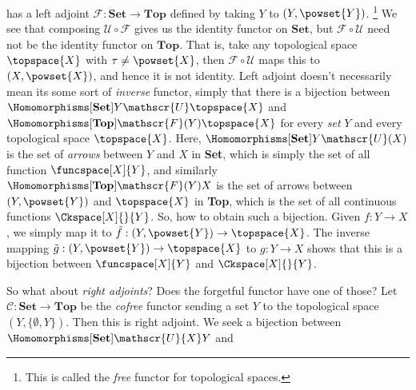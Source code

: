 \documentclass{book}                                                           %
\begin{document}
                has a left adjoint $\mathscr{F}:\mathbf{Set}\rightarrow\mathbf{Top}$
                defined by taking $Y$ to $(Y,\powset{Y})$.%
                \footnote{%
                    This is called the \textit{free} functor for topological
                    spaces.
                }
                We see that composing $\mathscr{U}\circ\mathscr{F}$ gives us
                the identity functor on $\mathbf{Set}$, but
                $\mathscr{F}\circ\mathscr{U}$ need not be the identity functor
                on $\mathbf{Top}$. That is, take any topological space
                $\topspace{X}$ with $\tau\ne\powset{X}$, then
                $\mathscr{F}\circ\mathscr{U}$ maps this to $(X,\powset{X})$, and
                hence it is not identity. Left adjoint doesn't necessarily mean
                its some sort of \textit{inverse} functor, simply that there is
                a bijection between
                $\Homomorphisms[\textbf{Set}]{Y}{\mathscr{U}\topspace{X}}$
                and $\Homomorphisms[\textbf{Top}]{\mathscr{F}(Y)}{\topspace{X}}$
                for every \textit{set} $Y$ and every topological space $\topspace{X}$.
                Here, $\Homomorphisms[\textbf{Set}]{Y}{\mathscr{U}(X)}$ is the
                set of \textit{arrows} between $Y$ and $X$ in \textbf{Set},
                which is simply the set of all function $\funcspace[X]{Y}$, and
                similarly $\Homomorphisms[\textbf{Top}]{\mathscr{F}(Y)}{X}$ is
                the set of arrows between $(Y,\powset{Y})$ and $\topspace{X}$ in
                \textbf{Top}, which is the set of all continuous functions
                $\Ckspace[X]{}{Y}$. So, how to obtain such a bijection. Given
                $f:Y\rightarrow{X}$, we simply map it to
                $\tilde{f}:(Y,\powset{Y})\rightarrow\topspace{X}$. The inverse
                mapping $\tilde{g}:(Y,\powset{Y})\rightarrow\topspace{X}$ to
                $g:Y\rightarrow{X}$ shows that this is a bijection between
                $\funcspace[X]{Y}$ and $\Ckspace[X]{}{Y}$.
                \par\hfill\par
                So what about \textit{right adjoints}? Does the forgetful
                functor have one of those? Let
                $\mathscr{C}:\textbf{Set}\rightarrow\textbf{Top}$ be the
                \textit{cofree} functor sending a set $Y$ to the topological
                space $(Y,\{\emptyset,Y\})$. Then this is right adjoint. We seek
                a bijection between
                $\Homomorphisms[\textbf{Set}]{\mathscr{U}{X}}{Y}$ and
\end{document}
